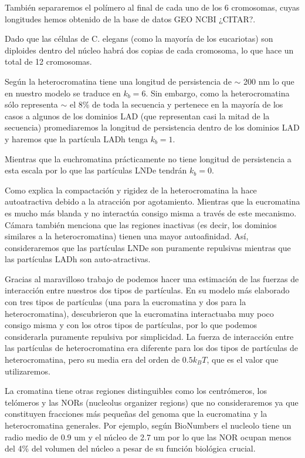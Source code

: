También separaremos el polímero al final de cada uno de los 6 cromosomas, cuyas longitudes hemos obtenido de la base de datos GEO NCBI ¿CITAR?.

Dado que las células de C. elegans (como la mayoría de los eucariotas) son diploides dentro del núcleo habrá dos copias de cada cromosoma, lo que hace un total de 12 cromosomas.

Según \cite{Bystricky2004} la heterocromatina tiene una longitud de persistencia de $\sim$ 200 nm lo que en nuestro modelo se traduce en $k_b=6$. Sin embargo, como la heterocromatina sólo representa $\sim$ el 8\% de toda la secuencia y pertenece en la mayoría de los casos a algunos de los dominios LAD (que representan casi la mitad de la secuencia) promediaremos la longitud de persistencia dentro de los dominios LAD y haremos que la partícula LADh tenga $k_b=1$.

Mientras que la euchromatina prácticamente no tiene longitud de persistencia a esta escala por lo que las partículas LNDe tendrán $k_b=0$.

Como explica \cite{Camara2023} la compactación y rigidez de la heterocromatina la hace autoatractiva debido a la atracción por agotamiento. Mientras que la eucromatina es mucho más blanda y no interactúa consigo misma a través de este mecanismo. Cámara también menciona que las regiones inactivas (es decir, los dominios similares a la heterocromatina) tienen una mayor autoafinidad. Así, consideraremos que las partículas LNDe son puramente repulsivas mientras que las partículas LADh son auto-atractivas.

Gracias al maravilloso trabajo de \cite{Falk2019} podemos hacer una estimación de las fuerzas de interacción entre nuestros dos tipos de partículas. En su modelo más elaborado con tres tipos de partículas (una para la eucromatina y dos para la heterocromatina), descubrieron que la eucromatina interactuaba muy poco consigo misma y con los otros tipos de partículas, por lo que podemos considerarla puramente repulsiva por simplicidad. La fuerza de interacción entre las partículas de heterocromatina era diferente para los dos tipos de partículas de heterocromatina, pero su media era del orden de $0.5k_BT$, que es el valor que utilizaremos.

La cromatina tiene otras regiones distinguibles como los centrómeros, los telómeros y las NORs (nucleolus organizer regions) que no consideraremos ya que constituyen fracciones más pequeñas del genoma que la eucromatina y la heterocromatina generales. Por ejemplo, según BioNumbers el nucleolo tiene un radio medio de 0.9 $\text{um}$ y el núcleo de 2.7 $\text{um}$ por lo que las NOR ocupan menos del 4\% del volumen del núcleo a pesar de su función biológica crucial.

